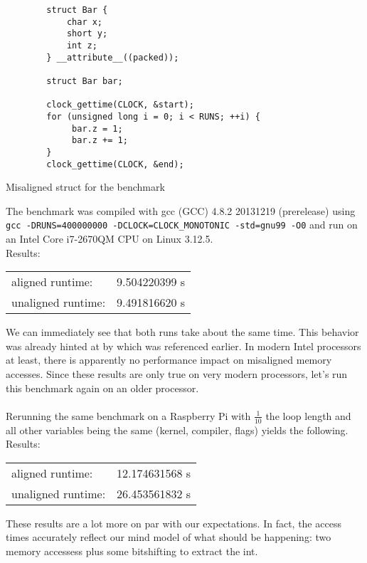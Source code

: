 \documentclass[a4paper,12pt]{scrartcl}
\begin{document}
\begin{listing}[H]
    \begin{verbatim}
        struct Bar {
            char x;
            short y;
            int z;
        } __attribute__((packed));

        struct Bar bar;

        clock_gettime(CLOCK, &start);
        for (unsigned long i = 0; i < RUNS; ++i) {
             bar.z = 1;
             bar.z += 1;
        }
        clock_gettime(CLOCK, &end);
    \end{verbatim}
    \label{struct-bench-misaligned}
    \caption{Misaligned struct for the benchmark}
\end{listing}
\noindent
The benchmark was compiled with gcc (GCC) 4.8.2 20131219 (prerelease) using
\verb|gcc -DRUNS=400000000 -DCLOCK=CLOCK_MONOTONIC -std=gnu99 -O0| and run on an
Intel Core i7-2670QM CPU on Linux 3.12.5.
\\
Results:
\begin{tabular}{l|l}
    aligned runtime: & 9.504220399 s\\
    unaligned runtime: & 9.491816620 s
\end{tabular}

We can immediately see that both runs take about the same time. This behavior was already hinted at
by \cite{misaligned-data} which was referenced earlier. In modern Intel processors at least, there
is apparently no performance impact on misaligned memory accesses. Since these results are only
true on very modern processors, let's run this benchmark again on an older processor.
\\
\\
Rerunning the same benchmark on a Raspberry Pi with \(\frac 1 {10}\) the loop length and all
other variables being the same (kernel, compiler, flags) yields the following.
\\
Results:
\begin{tabular}{l|l}
    aligned runtime: & 12.174631568 s\\
    unaligned runtime: & 26.453561832 s
\end{tabular}

These results are a lot more on par with our expectations. In fact, the access times accurately
reflect our mind model of what should be happening: two memory accessess plus some bitshifting to 
extract the int.
\end{document}
